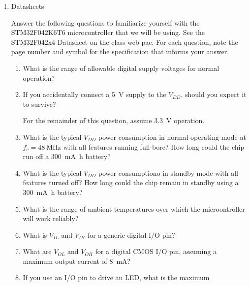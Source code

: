 \documentclass{ps}
\begin{document}
\begin{enumerate}
\item Datasheets

  Answer the following questions to familiarize yourself with the
  STM32F042K6T6 microcontroller that we will be using.  See the
  STM32F042x4 Datasheet on the class web pae.  For each question, note
  the page number and symbol for the specification that informs your
  answer.
  \begin{enumerate}
  \item What is the range of allowable digital supply voltages for
    normal operation?
    \begin{solution}
    \end{solution}
  \item If you accidentally connect a \SI{5}{\V} supply to the
    \(V_{DD}\), should you expect it to survive?
    \begin{solution}
    \end{solution}
    For the remainder of this question, assume \SI{3.3}{\V} operation.
  \item What is the typical \(V_{DD}\) power consumption in normal
    operating mode at \(f_c = \SI{48}{\MHz}\) with all features
    running full-bore?  How long could the chip run off a \SI{300}{\mA
      \hour} battery?
    \begin{solution}
    \end{solution}
  \item What is the typical \(V_{DD}\) power consumptiono in standby
    mode with all features turned off?  How long could the chip remain
    in standby using a \SI{300}{\mA \hour} battery?
    \begin{solution}
    \end{solution}
  \item What is the range of ambient temperatures over which the
    microontroller will work reliably?
    \begin{solution}
    \end{solution}
  \item What is \(V_{IL}\) and \(V_{IH}\) for a generic digital I/O
    pin?
    \begin{solution}
    \end{solution}
  \item What are \(V_{OL}\) and \(V_{OH}\) for a digital CMOS I/O pin,
    assuming a maximum output current of \SI{8}{\mA}?
    \begin{solution}
    \end{solution}
  \item If you use an I/O pin to drive an LED, what is the maximum

\end{enumerate}
\end{enumerate}
\end{document}
